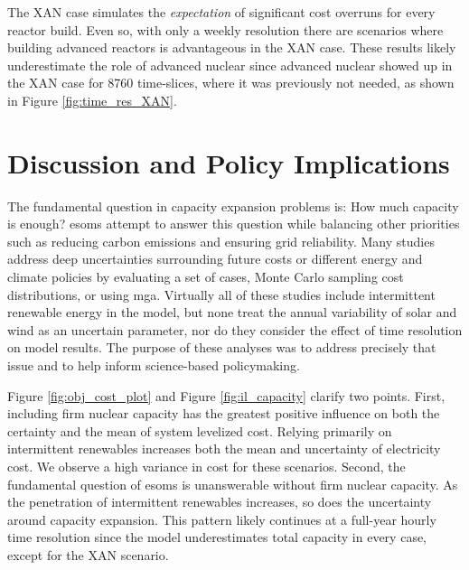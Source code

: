 The \gls{XAN} case simulates the
\textit{expectation} of significant cost overruns for every reactor build. Even so,
with only a weekly resolution there are scenarios where building advanced reactors
is advantageous in the \gls{XAN} case. These results likely underestimate the role of
advanced nuclear since advanced nuclear showed up in the \gls{XAN} case for 8760
time-slices, where it was previously not needed, as shown in Figure \ref{fig:time_res_XAN}.

\section{Discussion and Policy Implications}

The fundamental question in capacity expansion problems is: How much capacity is enough?
\glspl{esom} attempt to answer this question while balancing other priorities such
as reducing carbon emissions and ensuring grid reliability. Many studies address
deep uncertainties surrounding future costs
\cite{alzbutas_uncertainty_2012,barron_differential_2015,komiyama_energy_2015,
li_open_2020,yue_least_2020} or different energy and climate policies \cite{bennett_extending_2021,
bouckaert_expanding_2014,de_sisternes_value_2016,decarolis_modelling_2016,neumann_near-optimal_2021,
seck_embedding_2020} by evaluating a set of cases, Monte Carlo sampling cost distributions,
or using \gls{mga}. Virtually all of these studies include intermittent renewable
energy in the model, but none treat the annual variability of solar and wind
as an uncertain parameter, nor do they consider the effect of time resolution on
model results. The purpose of these analyses was to address precisely that issue
and to help inform science-based policymaking.

Figure \ref{fig:obj_cost_plot} and Figure \ref{fig:il_capacity} clarify
two points. First, including firm nuclear capacity has the greatest positive
influence on both the certainty and the mean of system levelized cost. Relying primarily
on intermittent renewables increases both the mean and uncertainty of electricity cost.
We observe a high variance in cost for these scenarios.
Second, the fundamental question of \glspl{esom} is unanswerable without firm nuclear capacity.
As the penetration of intermittent renewables increases, so does the uncertainty around
capacity expansion. This pattern likely continues at a full-year hourly time resolution
since the model underestimates total capacity in every case, except for the \gls{XAN} scenario.

